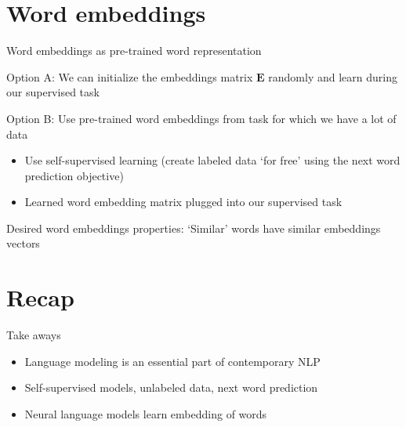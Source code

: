 \documentclass[12pt,aspectratio=169,handout]{beamer}
\begin{document}
\section{Word embeddings}

\begin{frame}{Word embeddings as pre-trained word representation}

Option A: We can initialize the embeddings matrix $\bm{E}$ randomly and learn during our supervised task

Option B: Use pre-trained word embeddings from task for which we have a lot of data

\begin{itemize}
	\item Use self-supervised learning (create labeled data `for free' using the next word prediction objective)
	\item Learned word embedding matrix plugged into our supervised task
\end{itemize}

Desired word embeddings properties: `Similar' words have similar embeddings vectors
\end{frame}


\section*{Recap}






\begin{frame}{Take aways}
	
\begin{itemize}
	\item Language modeling is an essential part of contemporary NLP
	\item Self-supervised models, unlabeled data, next word prediction
	\item Neural language models learn embedding of words
\end{itemize}
	
\end{frame}
\end{document}
